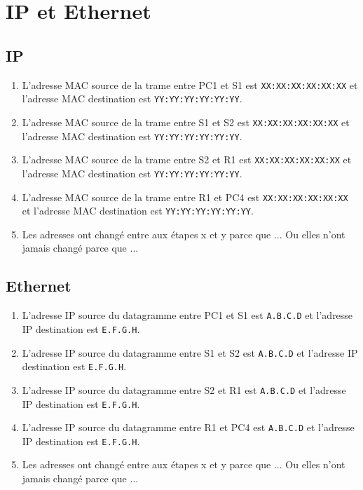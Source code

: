 \documentclass[]{article}
\begin{document}
\section*{IP et Ethernet}

\subsection*{IP}

\begin{enumerate}
    \item L'adresse MAC source de la trame entre PC1 et S1 est \texttt{XX:XX:XX:XX:XX:XX} et
          l'adresse MAC destination est \texttt{YY:YY:YY:YY:YY:YY}.
    \item L'adresse MAC source de la trame entre S1 et S2 est \texttt{XX:XX:XX:XX:XX:XX} et
          l'adresse MAC destination est \texttt{YY:YY:YY:YY:YY:YY}.
    \item L'adresse MAC source de la trame entre S2 et R1 est \texttt{XX:XX:XX:XX:XX:XX} et
          l'adresse MAC destination est \texttt{YY:YY:YY:YY:YY:YY}.
    \item L'adresse MAC source de la trame entre R1 et PC4 est \texttt{XX:XX:XX:XX:XX:XX} et
          l'adresse MAC destination est \texttt{YY:YY:YY:YY:YY:YY}.
    \item Les adresses ont changé entre aux étapes x et y parce que ...
          Ou elles n'ont jamais changé parce que ...
\end{enumerate}

\subsection*{Ethernet}

\begin{enumerate}
    \item L'adresse IP source du datagramme entre PC1 et S1 est \texttt{A.B.C.D} et
          l'adresse IP destination est \texttt{E.F.G.H}.
    \item L'adresse IP source du datagramme entre S1 et S2 est \texttt{A.B.C.D} et
          l'adresse IP destination est \texttt{E.F.G.H}.
    \item L'adresse IP source du datagramme entre S2 et R1 est \texttt{A.B.C.D} et
          l'adresse IP destination est \texttt{E.F.G.H}.
    \item L'adresse IP source du datagramme entre R1 et PC4 est \texttt{A.B.C.D} et
          l'adresse IP destination est \texttt{E.F.G.H}.
    \item Les adresses ont changé entre aux étapes x et y parce que ...
            Ou elles n'ont jamais changé parce que ...
\end{enumerate}
    
\end{document}
